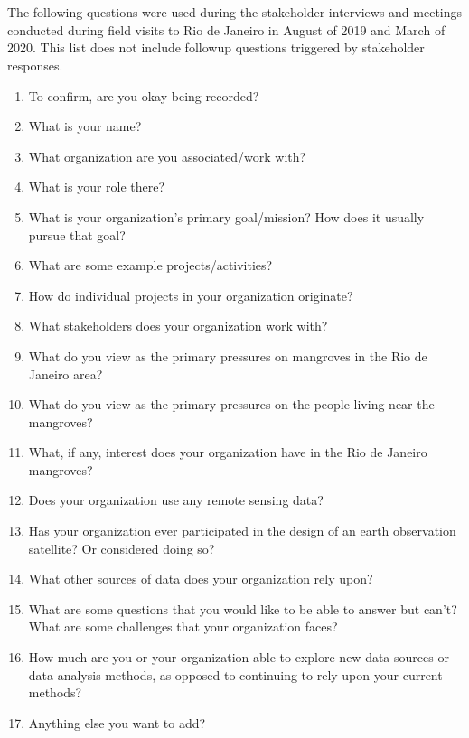 \chapter{} \label{interview-questions}

The following questions were used during the stakeholder interviews and meetings conducted during field visits to Rio de Janeiro in August of 2019 and March of 2020. This list does not include followup questions triggered by stakeholder responses.

\begin{enumerate}\setlength{\itemsep}{0pt}\setlength{\parskip}{0pt}
    \item{To confirm, are you okay being recorded?}
    \item{What is your name?}
    \item{What organization are you associated/work with?}
    \item{What is your role there?}
    \item{What is your organization's primary goal/mission? How does it usually pursue that goal?}
    \item{What are some example projects/activities?}
    \item{How do individual projects in your organization originate?}
    \item{What stakeholders does your organization work with?}
    \item{What do you view as the primary pressures on mangroves in the Rio de Janeiro area?}
    \item{What do you view as the primary pressures on the people living near the mangroves?}
    \item{What, if any, interest does your organization have in the Rio de Janeiro mangroves?}
    \item{Does your organization use any remote sensing data?}
    \item{Has your organization ever participated in the design of an earth observation satellite? Or considered doing so?}
    \item{What other sources of data does your organization rely upon?}
    \item{What are some questions that you would like to be able to answer but can't? What are some challenges that your organization faces?}
    \item{How much are you or your organization able to explore new data sources or data analysis methods, as opposed to continuing to rely upon your current methods?}
    \item{Anything else you want to add?}
\end{enumerate}